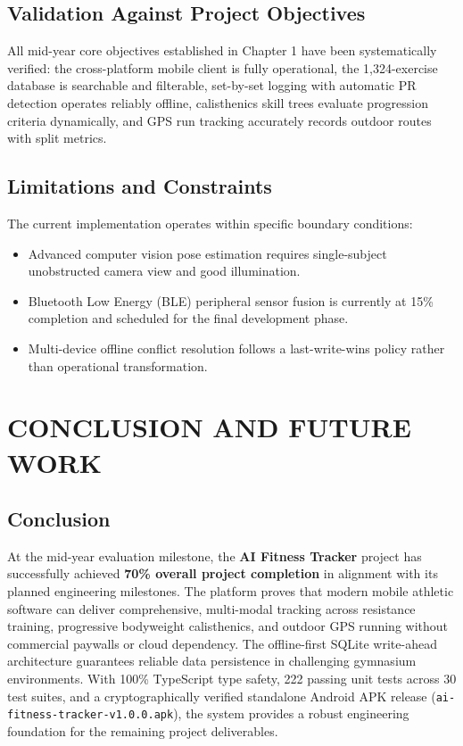 \documentclass[12pt,a4paper]{report}
\begin{document}
\section{Validation Against Project Objectives}
All mid-year core objectives established in Chapter 1 have been systematically verified: the cross-platform mobile client is fully operational, the 1,324-exercise database is searchable and filterable, set-by-set logging with automatic PR detection operates reliably offline, calisthenics skill trees evaluate progression criteria dynamically, and GPS run tracking accurately records outdoor routes with split metrics.

\section{Limitations and Constraints}
The current implementation operates within specific boundary conditions:
\begin{itemize}
    \item Advanced computer vision pose estimation requires single-subject unobstructed camera view and good illumination.
    \item Bluetooth Low Energy (BLE) peripheral sensor fusion is currently at 15\% completion and scheduled for the final development phase.
    \item Multi-device offline conflict resolution follows a last-write-wins policy rather than operational transformation.
\end{itemize}

\chapter{CONCLUSION AND FUTURE WORK}

\section{Conclusion}
At the mid-year evaluation milestone, the \textbf{AI Fitness Tracker} project has successfully achieved \textbf{70\% overall project completion} in alignment with its planned engineering milestones. The platform proves that modern mobile athletic software can deliver comprehensive, multi-modal tracking across resistance training, progressive bodyweight calisthenics, and outdoor GPS running without commercial paywalls or cloud dependency. The offline-first SQLite write-ahead architecture guarantees reliable data persistence in challenging gymnasium environments. With 100\% TypeScript type safety, 222 passing unit tests across 30 test suites, and a cryptographically verified standalone Android APK release (\texttt{ai-fitness-tracker-v1.0.0.apk}), the system provides a robust engineering foundation for the remaining project deliverables.
\end{document}

